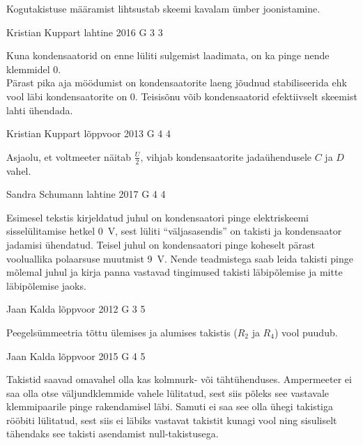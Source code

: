 \documentclass[11pt, twoside]{article}
\begin{document}
{{\ifHint
Kogutakistuse määramist lihtsustab skeemi kavalam ümber joonistamine.
\fi
}

{Kristian Kuppart} %
{lahtine} %
{2016} %
{G 3} %
{3} %
{

\ifHint
Kuna kondensaatorid on enne lüliti sulgemist laadimata, on ka pinge nende klemmidel $0$.\\
Pärast pika aja möödumist on kondensaatorite laeng jõudnud stabiliseerida ehk vool läbi kondensaatorite on $0$. Teisisõnu võib kondensaatorid efektiivselt skeemist lahti ühendada.
\fi
}

{Kristian Kuppart} %
{lõppvoor} %
{2013} %
{G 4} %
{4} %
{

\ifHint
Asjaolu, et voltmeeter näitab $\frac{U}{2}$, vihjab kondensaatorite jadaühendusele $C$ ja $D$ vahel.
\fi
}

{Sandra Schumann} %
{lahtine} %
{2017} %
{G 4} %
{4} %
{

\ifHint
Esimesel tekstis kirjeldatud juhul on kondensaatori pinge elektriskeemi sisselülitamise hetkel \SI{0}{V}, sest lüliti \enquote{väljasasendis} on takisti ja kondensaator jadamisi ühendatud. Teisel juhul on kondensaatori pinge koheselt pärast vooluallika polaarsuse muutmist \SI{9}{V}. Nende teadmistega saab leida takisti pinge mõlemal juhul ja kirja panna vastavad tingimused takisti läbipõlemise ja mitte läbipõlemise jaoks.
\fi
}

{Jaan Kalda} %
{lõppvoor} %
{2012} %
{G 3} %
{5} %
{

\ifHint
Peegelsümmeetria tõttu ülemises ja alumises takistis ($R_2$ ja $R_4$) vool puudub. 
\fi
}

{Jaan Kalda} %
{lõppvoor} %
{2015} %
{G 4} %
{5} %
{

\ifHint
Takistid saavad omavahel olla kas kolmnurk- või tähtühenduses. Ampermeeter ei saa olla otse väljundklemmide vahele lülitatud, sest siis põleks see vastavale klemmipaarile pinge rakendamisel läbi. Samuti ei saa see olla ühegi takistiga rööbiti lülitatud, sest siis ei läbiks vastavat takistit kunagi vool ning sisuliselt tähendaks see takisti asendamist null-takistusega.
\fi
}

}
\end{document}
